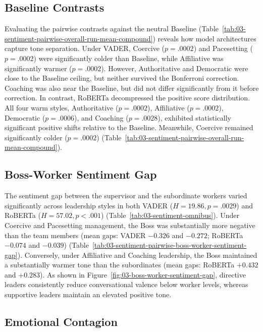 \subsection{Baseline Contrasts}
\label{subsec:baseline-contrasts}

Evaluating the pairwise contrasts against the neutral Baseline (Table~\ref{tab:03-sentiment-pairwise-overall-run-mean-compound}) reveals how model architectures capture tone separation.
Under \ac{VADER}, Coercive ($p = .0002$) and Pacesetting ($p = .0002$) were significantly colder than Baseline, while Affiliative was significantly warmer ($p = .0002$).
However, Authoritative and Democratic were close to the Baseline ceiling, but neither survived the Bonferroni correction.
Coaching was also near the Baseline, but did not differ significantly from it before correction.
In contrast, \ac{RoBERTa} decompressed the positive score distribution.
All four warm styles, Authoritative ($p = .0002$), Affiliative ($p = .0002$), Democratic ($p = .0006$), and Coaching ($p = .0028$), exhibited statistically significant positive shifts relative to the Baseline.
Meanwhile, Coercive remained significantly colder ($p = .0002$) (Table~\ref{tab:03-sentiment-pairwise-overall-run-mean-compound}).

\subsection{Boss-Worker Sentiment Gap}
\label{subsec:boss-worker-sentiment-gap}

The sentiment gap between the supervisor and the subordinate workers varied significantly across leadership styles in both \ac{VADER} ($H = 19.86, p = .0029$) and \ac{RoBERTa} ($H = 57.02, p < .001$) (Table~\ref{tab:03-sentiment-omnibus}).
Under Coercive and Pacesetting management, the Boss was substantially more negative than the team members (mean gaps: \ac{VADER} $-0.326$ and $-0.272$; \ac{RoBERTa} $-0.074$ and $-0.039$) (Table~\ref{tab:03-sentiment-pairwise-boss-worker-sentiment-gap}).
Conversely, under Affiliative and Coaching leadership, the Boss maintained a substantially warmer tone than the subordinates (mean gaps: \ac{RoBERTa} $+0.432$ and $+0.283$).
As shown in Figure~\ref{fig:03-boss-worker-sentiment-gap}, directive leaders consistently reduce conversational valence below worker levels, whereas supportive leaders maintain an elevated positive tone.

\subsection{Emotional Contagion}
\label{subsec:emotional-contagion}

